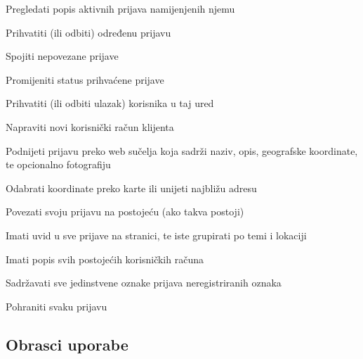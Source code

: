 \begin{packed_enum}
				\item {}
				
				\begin{packed_enum}
					
					\item Pregledati popis aktivnih prijava namijenjenih njemu
					\item Prihvatiti (ili odbiti) određenu prijavu
					\item Spojiti nepovezane prijave
					\item Promijeniti status prihvaćene prijave
					\item Prihvatiti (ili odbiti ulazak) korisnika u taj ured
				\end{packed_enum}
				
				\item  {}
				
				\begin{packed_enum}
					\item Napraviti novi korisnički račun klijenta
					\item Podnijeti prijavu preko web sučelja koja sadrži naziv, opis, geografske koordinate, te opcionalno fotografiju
					\item Odabrati koordinate preko karte ili unijeti najbližu adresu
					\item Povezati svoju prijavu na postojeću (ako takva postoji)
					\item Imati uvid u sve prijave na stranici, te iste grupirati po temi i lokaciji

				\end{packed_enum}
				
				\item  {}
				
				\begin{packed_enum}
				\item Imati popis svih postojećih korisničkih računa
				\item Sadržavati sve jedinstvene oznake prijava neregistriranih oznaka
				\item Pohraniti svaku prijavu
					
				\end{packed_enum}
			\end{packed_enum}
			\eject 
			
			
				
			\subsection{Obrasci uporabe}
				
